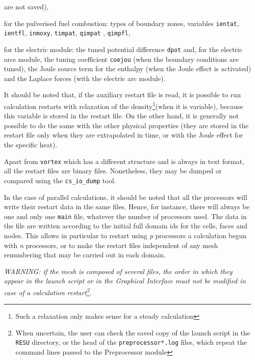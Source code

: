 {{{{\begin{list}{-}{}
are not saved),
\item for the pulverised fuel combustion: types of boundary
zones, variables \texttt{ientat}, \texttt{ientfl}, \texttt{inmoxy}, \texttt{timpat}, \texttt{qimpat}
, \texttt{qimpfl},
\item for the electric module: the tuned potential difference \texttt{dpot}%
and, for the electric arcs module, the tuning coefficient \texttt{coejou}%
(when the boundary conditions are tuned), the Joule source term for the enthalpy
(when the Joule effect is activated) and the Laplace forces (with the electric
arc module).
\end{list}

It should be noted that, if the auxiliary restart file is read, it is
possible to run calculation restarts with relaxation of the
density\footnote{Such a relaxation only makes sense for a steady
calculation}(when it is variable), because this variable is stored in the
restart file. On the other hand, it is generally not possible to do the
same with the other physical properties (they are stored in the restart
file only when they are extrapolated in time, or with the Joule effect for the
specific heat).

Apart from \texttt{vortex} which has a different structure and is
always in text format, all the restart files are binary
files. Nonetheless, they may be dumped or compared using
the \texttt{cs\_io\_dump} tool.

In the case of parallel calculations, it should be noted that all the processors
will write their restart data in the same files. Hence, for instance, there will
always be one and only one \texttt{main} file, whatever the number of
processors used. The data in the file are written according to the initial full
domain ids for the cells, faces and nodes. This allows in particular
to restart using {\it p} processors a calculation begun with {\it n} processors,
or to make the restart files independent of any mesh renumbering that may
be carried out in each domain.

{\em WARNING: if the mesh is composed of several files, the order
in which they appear in the launch script or in the Graphical Interface must not
be modified in case of a calculation restart\footnote{When uncertain, the user
can check the saved copy of the launch script in the \texttt{RESU} directory, or
the head of the \texttt{preprocessor*.log} files, which repeat the
command lines passed to the Preprocessor module}.}

}}}}
